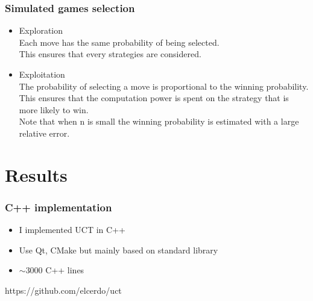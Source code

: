 \documentclass{beamer}
\begin{document}
\begin{frame}
\frametitle{Simulated games selection}
\begin{itemize}
 \item \alert{Exploration}
 \\ Each move has the same probability of being selected.
 \\ This ensures that every strategies are considered.
 \item \alert{Exploitation}
 \\ The probability of selecting a move is proportional to the winning probability.
 \\ This ensures that the computation power is spent on the strategy that is more likely to win.
 \\ Note that when n is small the winning probability is estimated with a large relative error.
\end{itemize}
\end{frame}

\section{Results}

\begin{frame}
\frametitle{C++ implementation}

\begin{itemize}
\item I implemented UCT in C++
\item Use Qt, CMake but mainly based on standard library
\item $\sim3000$ C++ lines
\end{itemize}
\begin{center}
\Huge \alert{https://github.com/elcerdo/uct}
\end{center}
\end{frame}
\end{document}
